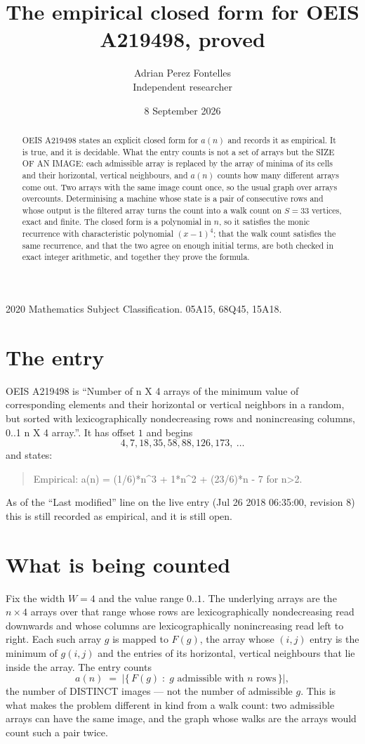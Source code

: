 \documentclass[11pt,a4paper]{article}
\title{The empirical closed form for OEIS A219498, proved}
\author{Adrian Perez Fontelles\\ \small Independent researcher}
\date{8 September 2026}
\theoremstyle{plain}
\theoremstyle{definition}
\begin{document}
\maketitle

\begin{abstract}
OEIS A219498 states an explicit closed form for $a(n)$ and records it as empirical. It is true, and
it is decidable. What the entry counts is not a set of arrays but the SIZE OF AN IMAGE: each
admissible array is replaced by the array of minima of its cells and their horizontal, vertical neighbours,
and $a(n)$ counts how many different arrays come out. Two arrays with the same image count
once, so the usual graph over arrays overcounts. Determinising a machine whose state is a pair
of consecutive rows and whose output is the filtered array turns the count into a walk count on
$S=33$ vertices, exact and finite. The closed form is a polynomial in $n$, so it satisfies the
monic recurrence with characteristic polynomial $(x-1)^{4}$; that the walk count
satisfies the same recurrence, and that the two agree on enough initial terms, are both checked
in exact integer arithmetic, and together they prove the formula.
\end{abstract}

\noindent\small 2020 Mathematics Subject Classification. 05A15, 68Q45, 15A18.\normalsize

\section{The entry}

OEIS A219498 is ``Number of n X 4 arrays of the minimum value of corresponding elements and their horizontal or vertical neighbors in a random, but sorted with lexicographically nondecreasing rows and nonincreasing columns, 0..1 n X 4 array.''. It has offset $1$ and begins
\[
4, 7, 18, 35, 58, 88, 126, 173,\ \dots
\]
and states:
\begin{quote}
Empirical: a(n) = (1/6)*n\^{}3 + 1*n\^{}2 + (23/6)*n - 7 for n>2.
\end{quote}
As of the ``Last modified'' line on the live entry (Jul 26 2018 06:35:00, revision 8)
this is still recorded as empirical, and it is still open.

\section{What is being counted}

Fix the width $W=4$ and the value range $0..1$. The underlying arrays are the
$n\times4$ arrays over that range whose rows are lexicographically nondecreasing read downwards
and whose columns are lexicographically nonincreasing read left to right. Each such array $g$
is mapped to $F(g)$, the array whose $(i,j)$ entry is the minimum of $g(i,j)$ and the entries
of its horizontal, vertical neighbours that lie inside the array. The entry counts
\[
a(n)\;=\;\bigl|\{\,F(g)\;:\;g\text{ admissible with }n\text{ rows}\,\}\bigr|,
\]
the number of DISTINCT images --- not the number of admissible $g$. This is what makes the
problem different in kind from a walk count: two admissible arrays can have the same image, and
the graph whose walks are the arrays would count such a pair twice.
\end{document}

